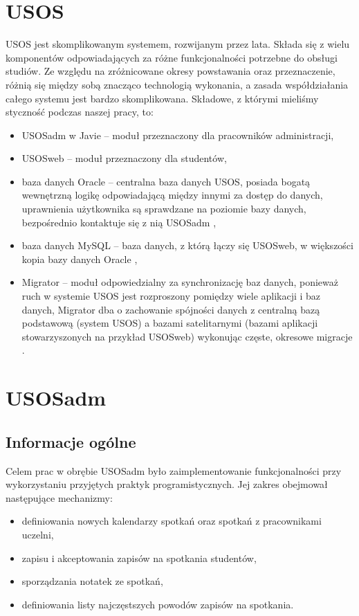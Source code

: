 \documentclass[licencjacka]{pracamgr}
\begin{document}
\section{USOS}
USOS jest skomplikowanym systemem, rozwijanym przez lata. Składa się z wielu komponentów odpowiadających za różne funkcjonalności potrzebne do obsługi studiów. Ze względu na zróżnicowane okresy powstawania oraz przeznaczenie, różnią się między sobą znacząco technologią wykonania, a zasada współdziałania całego systemu jest bardzo skomplikowana.
Składowe, z którymi mieliśmy styczność podczas naszej pracy, to:
\begin{itemize}
\item USOSadm w Javie -- moduł przeznaczony dla pracowników administracji,
\item USOSweb -- moduł przeznaczony dla studentów,
\item baza danych Oracle -- centralna baza danych USOS, posiada bogatą wewnętrzną logikę odpowiadającą między innymi za dostęp do danych, uprawnienia użytkownika są sprawdzane na poziomie bazy danych, bezpośrednio kontaktuje się z nią USOSadm \cite{rfd},
\item baza danych MySQL -- baza danych, z którą łączy się USOSweb, w większości kopia bazy danych Oracle \cite{wikibd},
\item Migrator -- moduł odpowiedzialny za synchronizację baz danych, ponieważ ruch w systemie USOS jest rozproszony pomiędzy wiele aplikacji i baz danych, Migrator dba o zachowanie spójności danych z centralną bazą podstawową (system USOS) a bazami satelitarnymi (bazami aplikacji stowarzyszonych na przykład USOSweb) wykonując częste, okresowe migracje \cite{wdr}.
\end{itemize}

\section{USOSadm} \label{sec:impusos}

\subsection{Informacje ogólne}
Celem prac w obrębie USOSadm było zaimplementowanie funkcjonalności przy wykorzystaniu przyjętych praktyk programistycznych. Jej zakres obejmował następujące mechanizmy:
\begin{itemize}
\item definiowania nowych kalendarzy spotkań oraz spotkań z pracownikami uczelni,
\item zapisu i akceptowania zapisów na spotkania studentów,
\item sporządzania notatek ze spotkań,
\item definiowania listy najczęstszych powodów zapisów na spotkania.
\end{itemize}
\end{document}
